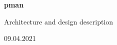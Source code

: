 \begin{titlepage}
    \thispagestyle{mypagestyle}

    \begin{flushleft}
        \vspace*{10cm}

        {\huge \huge \textbf{pman}}

        \vspace{0.5cm}
        {\large Architecture and design description}

        \vfill

        \vspace{0.8cm}

        {\large 09.04.2021}
    \end{flushleft}

\end{titlepage}
